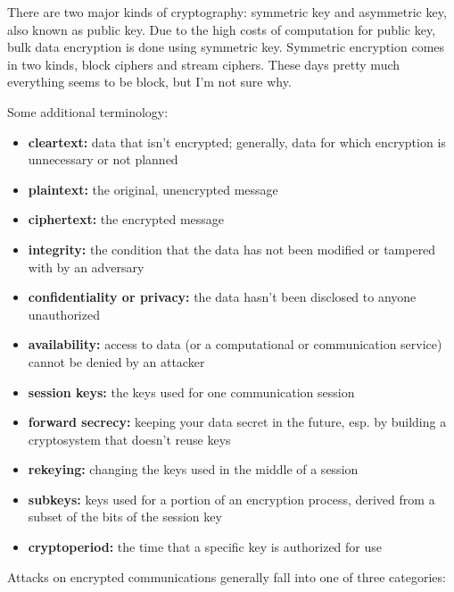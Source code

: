 There are two major kinds of cryptography: symmetric key and
asymmetric key, also known as public key.  Due to the high costs of
computation for public key, bulk data encryption is done using
symmetric key.  Symmetric encryption comes in two kinds, block ciphers
and stream ciphers.  These days pretty much everything seems to be
block, but I'm not sure why.  \aono{}

Some additional terminology:

\begin{itemize}
\item {\bf cleartext:} data that isn't encrypted; generally, data for
  which encryption is unnecessary or not planned
\item {\bf plaintext:} the original, unencrypted message
\item {\bf ciphertext:} the encrypted message
\item {\bf integrity:} the condition that the data has not been
  modified or tampered with by an adversary
\item {\bf confidentiality or privacy:} the data hasn't been disclosed to anyone unauthorized
\item {\bf availability:} access to data (or a computational or
  communication service) cannot be denied by an attacker
\item {\bf session keys:} the keys used for one communication session
\item {\bf forward secrecy:} keeping your data secret in the future, esp. by
  building a cryptosystem that doesn't reuse keys
\item {\bf rekeying:} changing the keys used in the middle of a session
\item {\bf subkeys:} keys used for a portion of an encryption process, derived
  from a subset of the bits of the session key
\item {\bf cryptoperiod:} the time that a specific key is authorized for use
\end{itemize}

Attacks on encrypted communications generally fall into one of three
categories:

